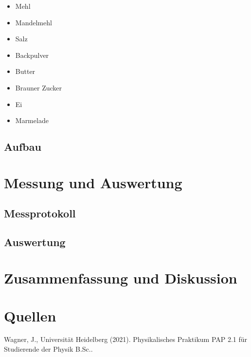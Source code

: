 \documentclass[a4paper,12pt]{article}
\begin{document}
    \begin{itemize}
        \item Mehl
        
        \item Mandelmehl
        
        \item Salz
        
        \item Backpulver
        
        \item Butter
        
        \item Brauner Zucker
        
        \item Ei
        
        \item Marmelade
    \end{itemize}
    
    \subsection{Aufbau}
    
\newpage    
    
\section{Messung und Auswertung}

    \subsection{Messprotokoll}
    
    \subsection{Auswertung}
    
\section{Zusammenfassung und Diskussion}

\section{Quellen}

Wagner, J., Universität Heidelberg (2021). Physikalisches Praktikum PAP 2.1 für Studierende der Physik B.Sc.. 




\end{document}
